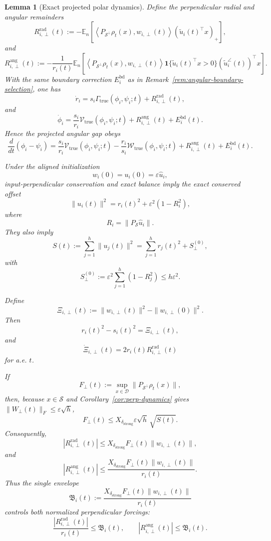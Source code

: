 \documentclass{article} %
\theoremstyle{plain}
\newtheorem{lemma}[theorem]{Lemma}
\theoremstyle{definition}
\theoremstyle{remark}
\begin{document}
\begin{lemma}[Exact projected polar dynamics]
Define the perpendicular radial and angular remainders
\[
\boxed{
R_{i,\perp}^{\mathrm{rad}}(t)
:=
-\mathbb E_n
\left[
\left\langle
P_{\mathcal S^\perp}\rho_t(x),
w_{i,\perp}(t)
\right\rangle
(\widetilde u_i(t)^\top x)_+
\right],
}
\]
and
\[
\boxed{
R_{i,\perp}^{\mathrm{ang}}(t)
:=
-\frac1{r_i(t)}
\mathbb E_n
\left[
\left\langle
P_{\mathcal S^\perp}\rho_t(x),
w_{i,\perp}(t)
\right\rangle
\mathbf 1\{\widetilde u_i(t)^\top x>0\}
(\widetilde u_i^\angle(t))^\top x
\right].
}
\]
With the same boundary correction $E_i^{\mathrm{bd}}$ as in
Remark~\ref{rem:angular-boundary-selection}, one has
\[
\boxed{
\dot r_i
=
s_i\Gamma_{\mathrm{true}}(\phi_i,\psi_i;t)
+
R_{i,\perp}^{\mathrm{rad}}(t),
}
\]
and
\[
\boxed{
\dot\phi_i
=
\frac{s_i}{r_i}
\mathcal V_{\mathrm{true}}(\phi_i,\psi_i;t)
+
R_{i,\perp}^{\mathrm{ang}}(t)
+
E_i^{\mathrm{bd}}(t).
}
\]
Hence the projected angular gap obeys
\[
\boxed{
\frac{d}{dt}(\phi_i-\psi_i)
=
\frac{s_i}{r_i}\mathcal V_{\mathrm{true}}(\phi_i,\psi_i;t)
-
\frac{r_i}{s_i}\mathcal W_{\mathrm{true}}(\phi_i,\psi_i;t)
+
R_{i,\perp}^{\mathrm{ang}}(t)
+
E_i^{\mathrm{bd}}(t).
}
\]

Under the aligned initialization
\[
w_i(0)=u_i(0)=\varepsilon\widehat u_i,
\]
input-perpendicular conservation and exact balance imply the exact conserved
offset
\[
\boxed{
\|u_i(t)\|^2
=
r_i(t)^2
+
\varepsilon^2(1-R_i^2),
}
\]
where
\[
R_i=\|P_{\mathcal S}\widehat u_i\|.
\]
They also imply
\[
\boxed{
S(t)
:=
\sum_{j=1}^h\|u_j(t)\|^2
=
\sum_{j=1}^h r_j(t)^2
+
S_\perp^{(0)},
}
\]
with
\[
S_\perp^{(0)}
:=
\varepsilon^2
\sum_{j=1}^h(1-R_j^2)
\le
h\varepsilon^2.
\]

Define
\[
\boxed{
\Xi_{i,\perp}(t)
:=
\|w_{i,\perp}(t)\|^2
-
\|w_{i,\perp}(0)\|^2.
}
\]
Then
\[
\boxed{
r_i(t)^2-s_i(t)^2
=
\Xi_{i,\perp}(t),
}
\]
and
\[
\boxed{
\dot\Xi_{i,\perp}(t)
=
2r_i(t)R_{i,\perp}^{\mathrm{rad}}(t)
}
\]
for a.e. $t$.

If
\[
F_\perp(t)
:=
\sup_{x\in\mathcal D}
\|P_{\mathcal S^\perp}\rho_t(x)\|,
\]
then, because $x\in\mathcal S$ and
Corollary~\ref{cor:perp-dynamics} gives
$\|W_\perp(t)\|_F\le\varepsilon\sqrt h$,
\[
\boxed{
F_\perp(t)
\le
X_{\delta_{\mathrm{strong}}}
\varepsilon\sqrt h\,
\sqrt{S(t)}.
}
\]
Consequently,
\[
\boxed{
|R_{i,\perp}^{\mathrm{rad}}(t)|
\le
X_{\delta_{\mathrm{strong}}}
F_\perp(t)
\|w_{i,\perp}(t)\|,
}
\]
and
\[
\boxed{
|R_{i,\perp}^{\mathrm{ang}}(t)|
\le
\frac{
X_{\delta_{\mathrm{strong}}}
F_\perp(t)
\|w_{i,\perp}(t)\|
}{r_i(t)}.
}
\]
Thus the single envelope
\[
\boxed{
\mathfrak B_i(t)
:=
\frac{
X_{\delta_{\mathrm{strong}}}
F_\perp(t)
\|w_{i,\perp}(t)\|
}{r_i(t)}
}
\]
controls both normalized perpendicular forcings:
\[
\boxed{
\frac{|R_{i,\perp}^{\mathrm{rad}}(t)|}{r_i(t)}
\le
\mathfrak B_i(t),
\qquad
|R_{i,\perp}^{\mathrm{ang}}(t)|
\le
\mathfrak B_i(t).
}
\]
\end{lemma}
\end{document}
